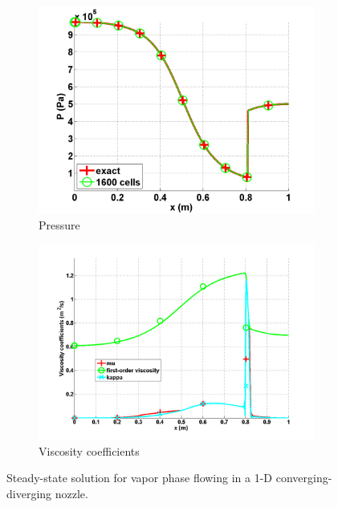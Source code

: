\documentclass[preprint,10pt]{elsarticle}
\begin{document}
\begin{figure}[H]
        \begin{subfigure}[b]{0.495\textwidth}
                \centering
                \includegraphics[width=\textwidth]{vapor_pressure_numerical_and_exact_1600.png}
                \caption{Pressure}
                \label{fig:1d_nozzle_vap_press}
        \end{subfigure}

        \begin{subfigure}[b]{0.495\textwidth}
                \centering
                \includegraphics[width=\textwidth]{vapor_viscosity_numerical1600.png}
                \caption{Viscosity coefficients}
                \label{fig:1d_nozzle_vap_visc}
        \end{subfigure}
        \caption{Steady-state solution for vapor phase flowing in a 1-D converging-diverging nozzle.}
				\label{fig:1d_vap_nozzle}
\end{figure}
\end{document}
